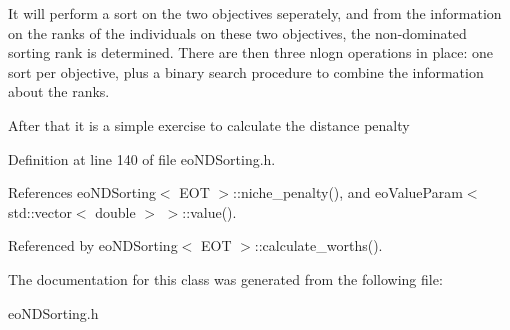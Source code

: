 It will perform a sort on the two objectives seperately, and from the information on the ranks of the individuals on these two objectives, the non-dominated sorting rank is determined. There are then three nlogn operations in place: one sort per objective, plus a binary search procedure to combine the information about the ranks.

After that it is a simple exercise to calculate the distance penalty 

Definition at line 140 of file eo\-NDSorting.h.

References eo\-NDSorting$<$ EOT $>$::niche\_\-penalty(), and eo\-Value\-Param$<$ std::vector$<$ double $>$ $>$::value().

Referenced by eo\-NDSorting$<$ EOT $>$::calculate\_\-worths().

The documentation for this class was generated from the following file:\begin{CompactItemize}
\item 
eo\-NDSorting.h\end{CompactItemize}
